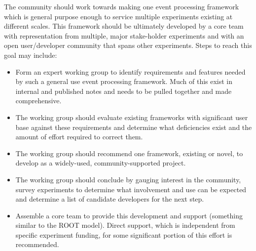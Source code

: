 \noindent The community should work towards making one event
processing framework which is general purpose enough to service
multiple experiments existing at different scales.  This framework
should be ultimately developed by a core team with representation from
multiple, major stake-holder experiments and with an open
user/developer community that spans other experiments.  Steps to reach
this goal may include:

\begin{itemize}
\item Form an expert working group to identify requirements and
  features needed by such a general use event processing framework.
  Much of this exist in internal and published notes and needs to be
  pulled together and made comprehensive.
\item The working group should evaluate existing frameworks with
  significant user base against these requirements and determine what
  deficiencies exist and the amount of effort required to correct
  them.
\item The working group should recommend one framework, existing or
  novel, to develop as a widely-used, community-supported project.
\item The working group should conclude by gauging interest in the
  community, survey experiments to determine what involvement and use
  can be expected and determine a list of candidate developers for the next
  step.
\item Assemble a core team to provide this development and support
  (something similar to the ROOT model).  Direct support, which is
  independent from specific experiment funding, for some significant
  portion of this effort is recommended.
\end{itemize}

